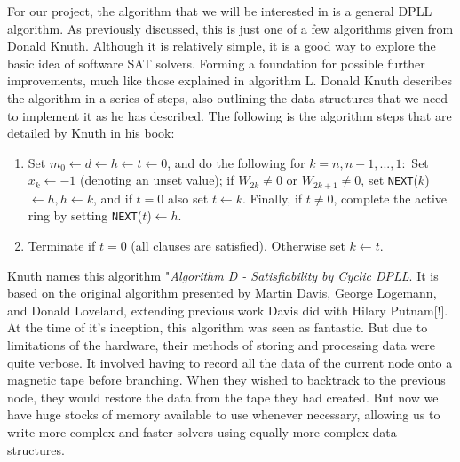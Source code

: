 \documentclass{article}
\begin{document}
For our project, the algorithm that we will be interested in is a general DPLL algorithm. As
previously discussed, this is just one of a few algorithms given from Donald Knuth. Although it is
relatively simple, it is a good way to explore the basic idea of software SAT solvers. Forming a
foundation for possible further improvements, much like those explained in algorithm L. Donald Knuth
describes the algorithm in a series of steps, also outlining the data structures that we need to
implement it as he has described. The following is the algorithm steps that are detailed by Knuth in his book:

\begin{enumerate}
    \item Set $m_0 \leftarrow d \leftarrow h \leftarrow t \leftarrow 0$, and do the following for $k = n, n - 1, ..., 1:$ Set $x_k ← -1$ (denoting an unset value); if $W_{2k} \neq 0$ or $W_{2k+1} \neq 0$, set \texttt{NEXT}($k$) $ \leftarrow h, h \leftarrow k$, and if $t = 0$ also set $t \leftarrow k$. Finally, if $t \neq 0$, complete the active ring by setting \texttt{NEXT}($t$)$ \leftarrow h$.
    \item Terminate if $t = 0$ (all clauses are satisfied). Otherwise set $k \leftarrow t$.
\end{enumerate}

Knuth names this algorithm "\textit{Algorithm D - Satisfiability by Cyclic DPLL}. It is based on the
original algorithm presented by Martin Davis, George Logemann, and Donald Loveland\cite{dpll},
extending previous work Davis did with Hilary Putnam[!]. At the time of it's inception, this
algorithm was seen as fantastic. But due to limitations of the hardware, their methods of storing
and processing data were quite verbose. It involved having to record all the data of the current
node onto a magnetic tape before branching. When they wished to backtrack to the previous node,
they would restore the data from the tape they had created. But now we have huge stocks of memory
available to use whenever necessary, allowing us to write more complex and faster solvers using
equally more complex data structures.
\end{document}
